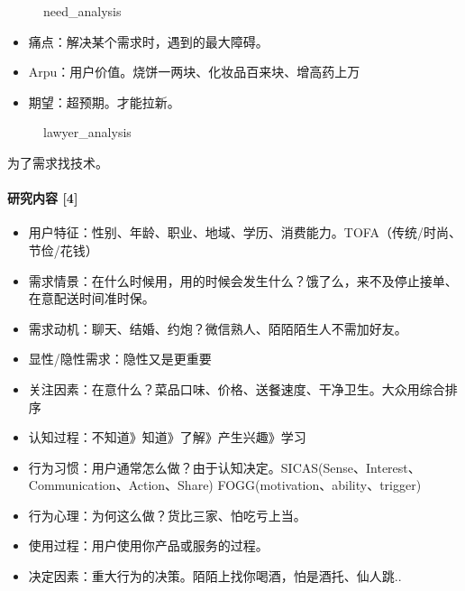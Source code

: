 \documentclass[letterpaper,10pt,english]{sphinxmanual}
\begin{document}
\begin{figure}[H]
\centering
\capstart

\noindent{}
\caption{need\_analysis}\label{\detokenize{chapter_knowledge/users_analysis:id43}}\end{figure}
\begin{itemize}
\item {} 
痛点：解决某个需求时，遇到的最大障碍。

\item {} 
Arpu：用户价值。烧饼一两块、化妆品百来块、增高药上万

\item {} 
期望：超预期。才能拉新。

\end{itemize}

\begin{figure}[H]
\centering
\capstart

\noindent{}
\caption{lawyer\_analysis}\label{\detokenize{chapter_knowledge/users_analysis:id44}}\end{figure}

为了需求找技术。


\paragraph{研究内容 {[}4{]}}
\label{\detokenize{chapter_knowledge/users_analysis:id24}}\begin{itemize}
\item {} 
用户特征：性别、年龄、职业、地域、学历、消费能力。TOFA（传统/时尚、节俭/花钱）

\item {} 
需求情景：在什么时候用，用的时候会发生什么？饿了么，来不及停止接单、在意配送时间准时保。

\item {} 
需求动机：聊天、结婚、约炮？微信熟人、陌陌陌生人不需加好友。

\item {} 
显性/隐性需求：隐性又是更重要

\item {} 
关注因素：在意什么？菜品口味、价格、送餐速度、干净卫生。大众用综合排序

\item {} 
认知过程：不知道》知道》了解》产生兴趣》学习

\item {} 
行为习惯：用户通常怎么做？由于认知决定。SICAS(Sense、Interest、Communication、Action、Share)
FOGG(motivation、ability、trigger)

\item {} 
行为心理：为何这么做？货比三家、怕吃亏上当。

\item {} 
使用过程：用户使用你产品或服务的过程。

\item {} 
决定因素：重大行为的决策。陌陌上找你喝酒，怕是酒托、仙人跳..

\end{itemize}
\end{document}
